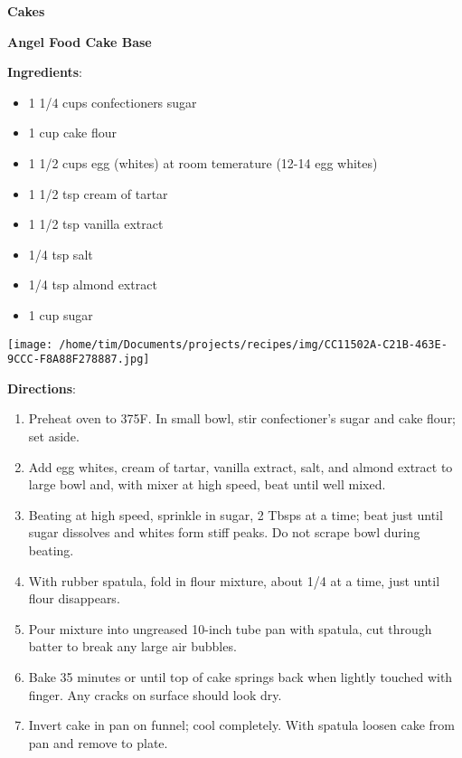 \documentclass[11pt, twoside, openany]{book}
\begin{document}
{\newpage \LARGE \textbf{Cakes}} \label{cakes}\\
\noindent\begin{minipage}[t]{\linewidth}%
{\Large\textbf{Angel Food Cake Base}} \label{angel-food-cake-base}\hfill\textit{}\\
\noindent\begin{minipage}[t]{0.78\linewidth}%
\textbf{Ingredients}:\vspace{-3mm}
\begin{multicols}{2}
\begin{itemize}\setlength\itemsep{-1mm}
\item 1 1/4 cups confectioners sugar
\item 1 cup cake flour
\item 1 1/2 cups egg (whites) at room temerature (12-14 egg whites)
\item 1 1/2 tsp cream of tartar
\item 1 1/2 tsp vanilla extract
\item 1/4 tsp salt
\item 1/4 tsp almond extract
\item 1 cup sugar
\end{itemize}
\end{multicols}
\end{minipage}
\noindent\begin{minipage}[t]{0.18\linewidth}
\centering \strut\vspace*{-\baselineskip}\newline
\texttt{[image: /home/tim/Documents/projects/recipes/img/CC11502A-C21B-463E-9CCC-F8A88F278887.jpg]}\\
\end{minipage}\vspace{3mm}
\textbf{Directions}:
\vspace{-3mm}\begin{enumerate}\setlength\itemsep{-1mm}
\item Preheat oven to 375F. In small bowl, stir confectioner's sugar and cake flour; set aside.
\item Add egg whites, cream of tartar, vanilla extract, salt, and almond extract to large bowl and, with mixer at high speed, beat until well mixed.
\item Beating at high speed, sprinkle in sugar, 2 Tbsps at a time; beat just until sugar dissolves and whites form stiff peaks. Do not scrape bowl during beating.
\item With rubber spatula, fold in flour mixture, about 1/4 at a time, just until flour disappears.
\item Pour mixture into ungreased 10-inch tube pan with spatula, cut through batter to break any large air bubbles.
\item Bake 35 minutes or until top of cake springs back when lightly touched with finger. Any cracks on surface should look dry.
\item Invert cake in pan on funnel; cool completely. With spatula loosen cake from pan and remove to plate.
\end{enumerate}
\end{minipage}\vspace{8mm}
\end{document}
